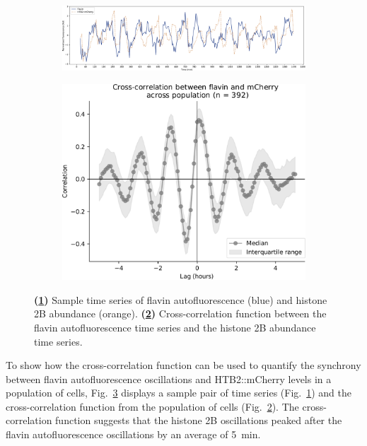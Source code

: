 \begin{figure}
  \centering
  \begin{subfigure}[t]{1.0\textwidth}
  \centering
    \includegraphics[width=\linewidth]{single_birth_plot_nostar.pdf}
    \caption{
    }
    \label{fig:xcf-biol-ts}
  \end{subfigure}

  \begin{subfigure}[t]{0.7\textwidth}
  \centering
    \includegraphics[width=\linewidth]{xcf_edit.pdf}
    \caption{
    }
    \label{fig:xcf-biol-xcf}
  \end{subfigure}

  \caption{
    \textbf{(\ref{fig:xcf-biol-ts})}
    Sample time series of flavin autofluorescence (blue) and histone 2B abundance (orange).
    \textbf{(\ref{fig:xcf-biol-xcf})}
    Cross-correlation function between the flavin autofluorescence time series and the histone 2B abundance time series.
  }
  \label{fig:xcf-biol}
\end{figure}

To show how the cross-correlation function can be used to quantify the synchrony between flavin autofluorescence oscillations and HTB2::mCherry levels in a population of cells, Fig.\ \ref{fig:xcf-biol} displays a sample pair of time series (Fig.\ \ref{fig:xcf-biol-ts}) and the cross-correlation function from the population of cells (Fig.\ \ref{fig:xcf-biol-xcf}).
The cross-correlation function suggests that the histone 2B oscillations peaked after the flavin autofluorescence oscillations by an average of \SI{5}{\minute}.


